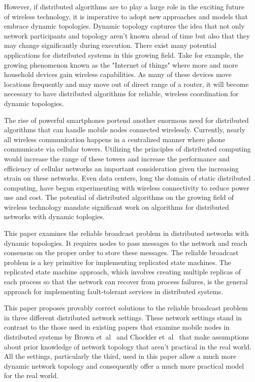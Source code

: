 \documentclass[english]{article}
\begin{document}
However, if distributed algorithms are to play a large role in the exciting future of wireless technology, it is imperative to adopt new approaches and models that embrace dynamic topologies. Dynamic topology captures the idea that not only network participants and topology aren't known ahead of time but also that they may change significantly during execution. There exist many potential applications for distributed systems in this growing field. Take for example, the growing phenomenon known as the "Internet of things" where more and more household devices gain wireless capabilities. As many of these devices move locations frequently and may move out of direct range of a router, it will become necessary to have distributed algorithms for reliable, wireless coordination for dynamic topologies.

The rise of powerful smartphones portend another enormous need for distributed algorithms that can handle mobile nodes connected wirelessly. Currently, nearly all wireless communication happens in a centralized manner where phone communicate via cellular towers. Utilizing the principles of distributed computing would increase the range of these towers and increase the performance and efficiency of cellular networks an important consideration given the increasing strain on these networks. Even data centers, long the domain of static distributed computing, have begun experimenting with wireless connectivity to reduce power use and cost. The potential of distributed algorithms on the growing field of wireless technology mandate significant work on algorithms for distributed networks with dynamic toplogies.

This paper examines the reliable broadcast problem in distributed networks with dynamic topologies. It requires nodes to pass messages to the network and reach consensus on the proper order to store these messages. The reliable broadcast problem is a key primitive for implementing replicated state machines. The replicated state machine approach, which involves creating multiple replicas of each process so that the network can recover from process failures, is the general approach for implementing fault-tolerant services in distributed systems.

This paper proposes provably correct solutions to the reliable broadcast problem in three different distributed network settings. These network settings stand in contrast to the those used in existing papers that examine mobile nodes in distributed systems by Brown et~al~\cite{Brown:2007} and Chockler et~al~\cite{Chockler:2008} that make assumptions about prior knowledge of network topology that aren't practical in the real world. All the settings, particularly the third, used in this paper allow a much more dynamic network topology and consequently offer a much more practical model for the real world.
\end{document}
